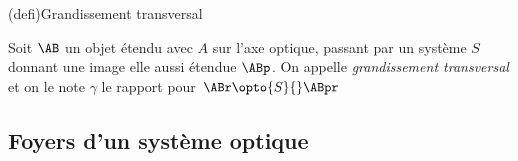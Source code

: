 \documentclass[../../main/main.tex]{subfiles}
\begin{document}
\begin{tcb}[label=def:grand, sidebyside](defi){Grandissement transversal}

	Soit $\AB$ un objet étendu avec $A$ sur l'axe optique, passant par
	un système $S$ donnant une image elle aussi étendue $\ABp$. On
	appelle \textit{grandissement transversal} et on le note $\gamma$ le
	rapport
	\psw{
		\[
			\boxed{\gamma = \frac{\ABp}{\AB}}
		\]
	}
	pour $\ABr \opto{S}{} \ABpr$
	\tcblower
	\begin{center}
	\end{center}
\end{tcb}

\subsection{Foyers d'un système optique}
\end{document}
